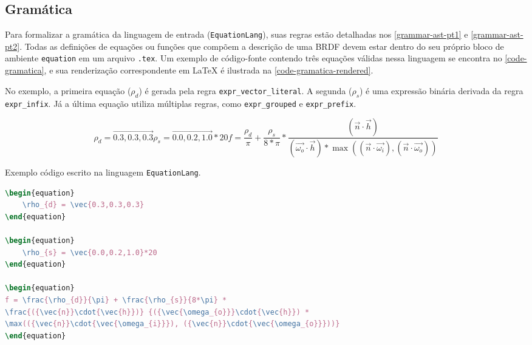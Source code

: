 \subsection{Gramática} \label{subsection-grammar}



Para formalizar a gramática da linguagem de entrada (\texttt{EquationLang}), suas regras estão detalhadas nos \autoref{grammar-ast-pt1} e \autoref{grammar-ast-pt2}. Todas as definições de equações ou funções que compõem a descrição de uma BRDF devem estar dentro do seu próprio bloco de ambiente \verb`equation` em um arquivo \texttt{.tex}. Um exemplo de código-fonte contendo três equações válidas nessa linguagem se encontra no \autoref{code-gramatica}, e sua renderização correspondente em \LaTeX{} é ilustrada na \autoref{code-gramatica-rendered}.

No exemplo, a primeira equação ($\rho_{d}$) é gerada pela regra \verb"expr_vector_literal". A segunda ($\rho_{s}$) é uma expressão binária derivada da regra \verb"expr_infix". Já a última equação utiliza múltiplas regras, como \verb"expr_grouped" e \verb"expr_prefix". 


\begin{subequations}
\label{code-gramatica-rendered} 
\begin{equation}
    \rho_{d} = \vec{0.3,0.3,0.3}
\end{equation}
\begin{equation}
    \rho_{s} = \vec{0.0,0.2,1.0} * 20
\end{equation}
\begin{equation}
f = \frac{\rho_{d}}{\pi} + \frac{\rho_{s}}{8*\pi} * \frac{({\vec{n}}\cdot{\vec{h}})} {({\vec{\omega_{o}}}\cdot{\vec{h}}) * \max(({\vec{n}}\cdot{\vec{\omega_{i}}}), ({\vec{n}}\cdot{\vec{\omega_{o}}}))}
\end{equation}
\end{subequations}


\begin{codigo}[H]
        \caption{\small Exemplo código escrito na linguagem \texttt{EquationLang}. }
        \label{code-gramatica}
\begin{lstlisting}[language=tex, frame=none]
\begin{equation}
    \rho_{d} = \vec{0.3,0.3,0.3}
\end{equation}

\begin{equation}
    \rho_{s} = \vec{0.0,0.2,1.0}*20
\end{equation}

\begin{equation}
f = \frac{\rho_{d}}{\pi} + \frac{\rho_{s}}{8*\pi} *
\frac{({\vec{n}}\cdot{\vec{h}})} {({\vec{\omega_{o}}}\cdot{\vec{h}}) *
\max(({\vec{n}}\cdot{\vec{\omega_{i}}}), ({\vec{n}}\cdot{\vec{\omega_{o}}}))}
\end{equation}

\end{lstlisting}
\end{codigo}

